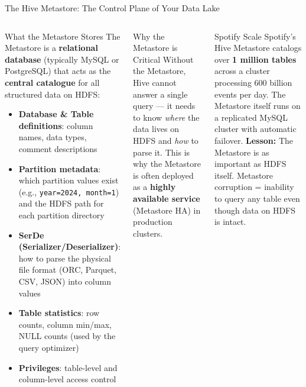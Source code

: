 \documentclass[aspectratio=169,10pt]{beamer}
\begin{document}
\begin{frame}{The Hive Metastore: The Control Plane of Your Data Lake}
  \begin{columns}[T]
      \begin{block}{What the Metastore Stores}
        The Metastore is a \textbf{relational database} (typically MySQL or PostgreSQL) that acts as the \textbf{central catalogue} for all structured data on HDFS:
        \vspace{4pt}
        \begin{itemize}
          \item \textbf{Database \& Table definitions}: column names, data types, comment descriptions
          \item \textbf{Partition metadata}: which partition values exist (e.g., \texttt{year=2024, month=1}) and the HDFS path for each partition directory
          \item \textbf{SerDe (Serializer/Deserializer)}: how to parse the physical file format (ORC, Parquet, CSV, JSON) into column values
          \item \textbf{Table statistics}: row counts, column min/max, NULL counts (used by the query optimizer)
          \item \textbf{Privileges}: table-level and column-level access control
        \end{itemize}
      \end{block}

      \begin{alertblock}{Why the Metastore is Critical}
        \small Without the Metastore, Hive cannot answer a single query — it needs to know \textit{where} the data lives on HDFS and \textit{how} to parse it.  This is why the Metastore is often deployed as a \textbf{highly available service} (Metastore HA) in production clusters.
      \end{alertblock}
      \vspace{6pt}
      \begin{exampleblock}{Spotify Scale}
        \small Spotify's Hive Metastore catalogs over \textbf{1 million tables} across a cluster processing 600 billion events per day.  The Metastore itself runs on a replicated MySQL cluster with automatic failover.
        \vspace{4pt}
        \textbf{Lesson:} The Metastore is as important as HDFS itself.  Metastore corruption = inability to query any table even though data on HDFS is intact.
      \end{exampleblock}
  \end{columns}
\end{frame}
\end{document}
